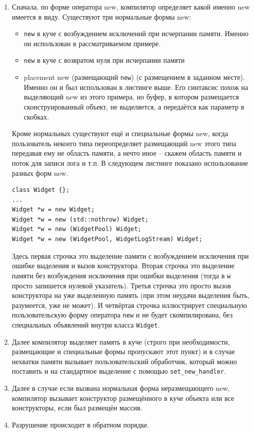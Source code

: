 \documentclass[a4paper,12pt,oneside]{book}
\begin{document}
\begin{enumerate}
\item
Сначала, по форме оператора new, компилятор определяет какой именно new имеется в виду. Существуют три нормальные формы new:
\begin{itemize}
\item
\lstinline!new! в куче с возбуждением исключений при исчерпании памяти. Именно он использован в рассматриваемом примере.
\item
\lstinline!new! в куче с возвратом нуля при исчерпании памяти
\item
placement new (размещающий \lstinline!new!) (с размещением в заданном месте). Именно он и был использован в листинге выше. Его синтаксис похож на выделяющий new из этого примера, но буфер, в котором размещается сконструированный объект, не выделяется, а передаётся как параметр в скобках.
\end{itemize}

Кроме нормальных существуют ещё и специальные формы new, когда пользователь некоего типа переопределяет размещающий new этого типа передавая ему не область памяти, а нечто иное -- скажем область памяти и поток для записи лога и т.п. В следующем листинге показано использование разных форм new.

\begin{lstlisting}
class Widget {};
...
Widget *w = new Widget;
Widget *w = new (std::nothrow) Widget;
Widget *w = new (WidgetPool) Widget;
Widget *w = new (WidgetPool, WidgetLogStream) Widget;
\end{lstlisting}

Здесь первая строчка это выделение памяти с возбуждением исключения при ошибке выделения и вызов конструктора. Вторая строчка это выделение памяти без возбуждения исключения при ошибки выделения (тогда в \lstinline!w! просто запишется нулевой указатель). Третья строчка это просто вызов конструктора на уже выделенную память (при этом неудачи выделения быть, разумеется, уже не может). И четвёртая строчка иллюстрирует специальную пользовательскую форму оператора \lstinline!new! и не будет скомпилирована, без специальных объявлений внутри класса \lstinline!Widget!.

\item
Далее компилятор выделяет память в куче (строго при необходимости, размещающие и специальные формы пропускают этот пункт) и в случае нехватки памяти вызывает пользовательский обработчик, который можно поставить и на стандартное выделение с помощью \lstinline!set_new_handler!.
\item
Далее в случае если вызвана нормальная форма неразмещающего new, компилятор вызывает конструктор размещённого в куче объекта или все конструкторы, если был размещён массив.
\item
Разрушение происходит в обратном порядке.
\end{enumerate}
\end{document}
